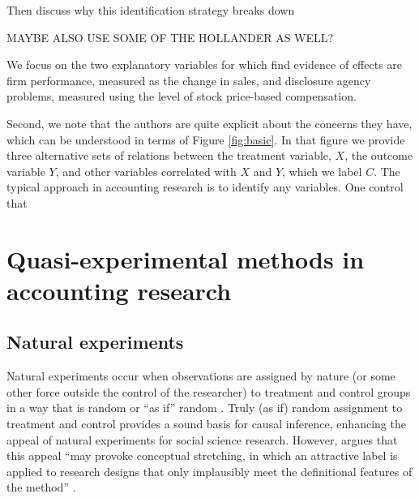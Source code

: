 \documentclass[11pt]{amsart}
\begin{document}
Then discuss why this identification strategy  breaks down


MAYBE ALSO USE SOME OF THE HOLLANDER AS WELL?


We focus on the two explanatory variables for which \citet{Hollander:2010jg} find evidence of effects are firm performance, measured as the change in sales, and disclosure agency problems, measured using the level of stock price-based compensation.



Second, we note that the authors are quite explicit about the concerns they have, which can be understood in terms of Figure \ref{fig:basic}.
In that figure we provide three alternative sets of relations between the treatment variable, $X$, the outcome variable $Y$, and other variables correlated with $X$ and $Y$, which we label $C$.
The typical approach in accounting research is to identify any variables.
One control that %








%





\section{Quasi-experimental methods in accounting research}


\subsection{Natural experiments}
Natural experiments occur when observations are assigned by nature (or some other force outside the control of the researcher) to treatment and control groups in a way that is random or ``as if'' random \citep{Dunning:2012tt}. 
Truly (as if) random assignment to treatment and control provides a sound basis for causal inference, enhancing the appeal of natural experiments for social science research.
However, argues that this appeal ``may provoke conceptual stretching, in which an attractive label is applied to research designs that only implausibly meet the definitional features of the method'' \citep[p.3]{Dunning:2012tt}.
\end{document}
